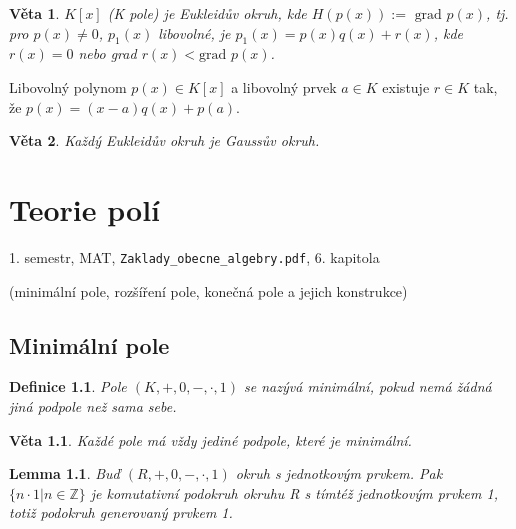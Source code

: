 \documentclass[a4paper, 11pt]{report}
\newtheorem{mydef}{Definice}[chapter]
\newtheorem{veta}{Věta}
\newtheorem{lemma}{Lemma}
\begin{document}
\begin{veta}
$K[x]$ (K pole) je Eukleidův okruh, kde $H(p(x)) := \text{ grad }p(x)$, tj. pro $p(x) \not= 0$, $p_1(x)$ libovolné, je $p_1(x) = p(x)q(x) + r(x)$, kde $r(x) = 0$ nebo grad $r(x) < \text{grad }p(x)$.
\end{veta}

Libovolný polynom $p(x) \in K[x]$ a libovolný prvek $a \in K$ existuje $r \in K$ tak, že $p(x) = (x - a)q(x) + p(a)$.

\begin{veta}
Každý Eukleidův okruh je Gaussův okruh.
\end{veta}













\chapter{Teorie polí} \label{cha:11}

1. semestr, MAT, \texttt{Zaklady\_obecne\_algebry.pdf}, 6. kapitola

(minimální pole, rozšíření pole, konečná pole a jejich konstrukce)

\section{Minimální pole}
\begin{mydef}
Pole $(K, +, 0, -, \cdot, 1)$ se nazývá minimální, pokud nemá žádná jiná podpole než sama sebe.
\end{mydef}

\begin{veta}
Každé pole má vždy jediné podpole, které je minimální.
\end{veta}

\begin{lemma}
Buď $(R, +, 0, -, \cdot, 1)$ okruh s jednotkovým prvkem. Pak $\{n \cdot 1 | n \in \mathbb{Z}\}$ je komutativní podokruh okruhu R s tímtéž jednotkovým prvkem 1, totiž podokruh generovaný prvkem 1.
\end{lemma}
\end{document}
